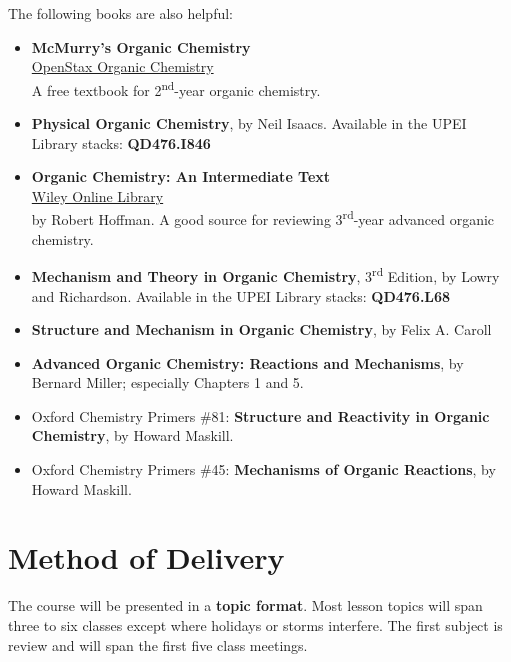 The following books are also helpful:

\begin{itemize}
\item \textbf{McMurry's Organic Chemistry}\\
\href{https://openstax.org/details/books/organic-chemistry}{OpenStax Organic Chemistry}\\
A free textbook for 2\textsuperscript{nd}-year organic chemistry.

\item \textbf{Physical Organic Chemistry}, by Neil Isaacs. Available in the UPEI Library stacks: \textbf{QD476.I846}

\item \textbf{Organic Chemistry: An Intermediate Text}\\
\href{https://onlinelibrary-wiley-com.proxy.library.upei.ca/doi/book/10.1002/0471648736}{Wiley Online Library}\\
by Robert Hoffman. A good source for reviewing 3\textsuperscript{rd}-year advanced organic chemistry.

\item \textbf{Mechanism and Theory in Organic Chemistry}, 3\textsuperscript{rd} Edition, by Lowry and Richardson. Available in the UPEI Library stacks: \textbf{QD476.L68}

\item \textbf{Structure and Mechanism in Organic Chemistry}, by Felix A. Caroll

\item \textbf{Advanced Organic Chemistry: Reactions and Mechanisms}, by Bernard Miller; especially Chapters 1 and 5.

\item Oxford Chemistry Primers \#81: \textbf{Structure and Reactivity in Organic Chemistry}, by Howard Maskill.

\item Oxford Chemistry Primers \#45: \textbf{Mechanisms of Organic Reactions}, by Howard Maskill.
\end{itemize}

\section{Method of Delivery}

The course will be presented in a \textbf{topic format}. Most lesson topics will span three to six classes except where holidays or storms interfere. The first subject is review and will span the first five class meetings.

